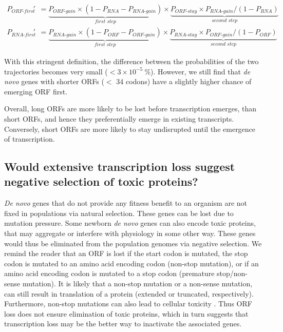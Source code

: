 \documentclass[12pt,a4paper]{article}
\begin{document}
\begin{align}
P_\textit{ORF-first}' & = \underbrace{P_\textit{ORF-gain} \times (1-P_\textit{RNA} -P_\textit{RNA-gain})}_\textit{first step} \times \underbrace{P_\textit{ORF-stay}\times P_\textit{RNA-gain}/(1-P_\textit{RNA})}_\textit{second step} \label{orffirsteq2}\\[1em]
P_\textit{RNA-first}' & = \underbrace{P_\textit{RNA-gain} \times (1-P_\textit{ORF} -P_\textit{ORF-gain})}_\textit{first step} \times \underbrace{P_\textit{RNA-stay}\times P_\textit{ORF-gain}/(1-P_\textit{ORF})}_\textit{second step}\label{rnafirsteq2}
\end{align}

With this stringent definition, the difference between the probabilities of the two trajectories becomes very small ($< 3\times10^{-5}\ \%$). However, we still find that \textit{de novo} genes with shorter ORFs ($<$ 34 codons) have a slightly higher chance of emerging ORF first.

Overall, long ORFs are more likely to be lost before transcription emerges, than short ORFs, and hence they preferentially emerge in existing transcripts. Conversely, short ORFs are more likely to stay undisrupted until the emergence of transcription.

\subsection{Would extensive transcription loss suggest negative selection of toxic proteins?}


\textit{De novo} genes that do not provide any fitness benefit to an organism are not fixed in populations via natural selection. These genes can be lost due to mutation pressure. Some newborn \textit{de novo} genes can also encode toxic proteins, that may aggregate or interfere with physiology in some other way. These genes would thus be eliminated from the population genomes via negative selection. We remind the reader that an ORF is lost if the start codon is mutated, the stop codon is mutated to an amino acid encoding codon (non-stop mutation), or if an amino acid encoding codon is mutated to a stop codon (premature stop/non-sense mutation). It is likely that a non-stop mutation or a non-sense mutation, can still result in translation of a protein (extended or truncated, respectively). Furthermore, non-stop mutations can also lead to cellular toxicity \citep{nonstop}. Thus ORF loss does not ensure elimination of toxic proteins, which in turn suggests that transcription loss may be the better way to inactivate the associated genes.
\end{document}
